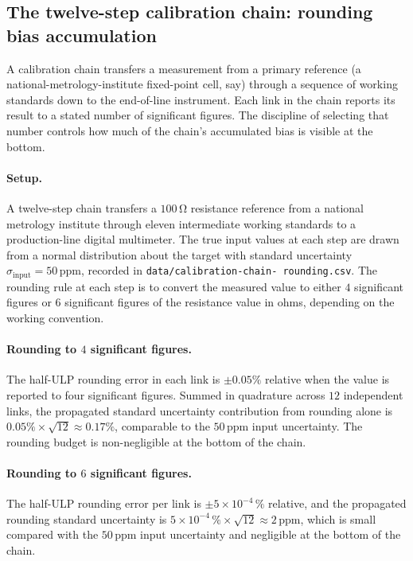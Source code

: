 \subsection{The twelve-step calibration chain: rounding bias
accumulation}

A calibration chain transfers a measurement from a primary
reference (a national-metrology-institute fixed-point cell,
say) through a sequence of working standards down to the
end-of-line instrument. Each link in the chain reports its
result to a stated number of significant figures. The
discipline of selecting that number controls how much of the
chain's accumulated bias is visible at the bottom.

\paragraph{Setup.} A twelve-step chain transfers a $100\,\si{
\ohm}$ resistance reference from a national metrology
institute through eleven intermediate working standards to a
production-line digital multimeter. The true input values at
each step are drawn from a normal distribution about the
target with standard uncertainty $\sigma_{\text{input}} =
50\,\text{ppm}$, recorded in \texttt{data/calibration-chain-
rounding.csv}. The rounding rule at each step is to convert the
measured value to either $4$ significant figures or $6$
significant figures of the resistance value in ohms, depending
on the working convention.

\paragraph{Rounding to $4$ significant figures.} The half-ULP
rounding error in each link is $\pm 0.05\%$ relative when the
value is reported to four significant figures. Summed in
quadrature across $12$ independent links, the propagated
standard uncertainty contribution from rounding alone is
$0.05\% \times \sqrt{12} \approx 0.17\%$, comparable to the
$50\,\text{ppm}$ input uncertainty. The rounding budget is
non-negligible at the bottom of the chain.

\paragraph{Rounding to $6$ significant figures.} The half-ULP
rounding error per link is $\pm 5 \times 10^{-4}\,\%$ relative,
and the propagated rounding standard uncertainty is
$5 \times 10^{-4}\,\% \times \sqrt{12} \approx 2\,\text{ppm}$,
which is small compared with the $50\,\text{ppm}$ input
uncertainty and negligible at the bottom of the chain.

